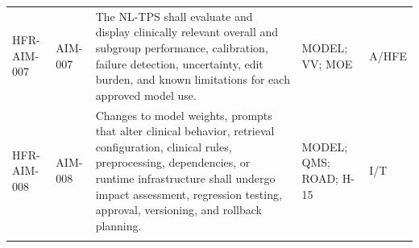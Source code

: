 \documentclass[11pt,letterpaper]{article}
\begin{document}
\begin{scriptsize}
\begin{longtable}{@{}L{0.14\textwidth}L{0.09\textwidth}L{0.47\textwidth}L{0.15\textwidth}L{0.07\textwidth}@{}}
\addlinespace[2pt]
\mbox{HFR-AIM-007} & \mbox{AIM-007} & The NL-TPS shall evaluate and display clinically relevant overall and subgroup performance, calibration, failure detection, uncertainty, edit burden, and known limitations for each approved model use. & MODEL; VV; MOE & A\slash\allowbreak{}HFE \\
\addlinespace[2pt]
\mbox{HFR-AIM-008} & \mbox{AIM-008} & Changes to model weights, prompts that alter clinical behavior, retrieval configuration, clinical rules, preprocessing, dependencies, or runtime infrastructure shall undergo impact assessment, regression testing, approval, versioning, and rollback planning. & MODEL; QMS; ROAD; H-15 & I\slash\allowbreak{}T \\
\addlinespace[2pt]
\end{longtable}
\end{scriptsize}
\end{document}
